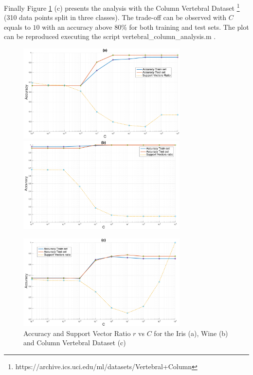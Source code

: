 Finally Figure \ref{fig:datasets} (c) presents the analysis with the Column Vertebral Dataset \footnote{https://archive.ics.uci.edu/ml/datasets/Vertebral+Column} (310 data points split in three classes).
The trade-off can be observed with $C$ equals to $10$ with an accuracy above 80\% for both training and test sets.
The plot can be reproduced executing the script vertebral\_column\_analysis.m .

\begin{figure}[!htb]
\begin{center}
\includegraphics [width=8.5cm] {./graphics/iris.png}
\includegraphics [width=8.5cm] {./graphics/wine.png}

\includegraphics [width=8.5cm] {./graphics/vertebral_column.png}
\caption{Accuracy and Support Vector Ratio $r$ vs $C$ for the Iris (a), Wine (b) and Column Vertebral Dataset (c)} \label{fig:datasets}
\end{center}
\end{figure}



